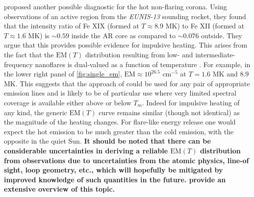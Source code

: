 \documentclass[preprint]{aastex}
\begin{document}
		\par\citet{brosius_pervasive_2014} proposed another possible diagnostic for the hot non-flaring corona. Using observations of an active region from the \textit{EUNIS-13} sounding rocket, they found that the intensity ratio of Fe XIX (formed at $T\approx8.9$ MK) to Fe XII (formed at $T\approx1.6$ MK) is $\sim0.59$ inside the AR core as compared to $\sim0.076$ outside. They argue that this provides possible evidence for impulsive heating. This arises from the fact that the $\mathrm{EM}(T)$ distribution resulting from low- and intermediate-frequency nanoflares is dual-valued as a function of temperature \citep[see \autoref{fig:single_em}-\autoref{fig:ion_em} and][]{cargill_implications_1994}. For example, in the lower right panel of \autoref{fig:single_em}, $\mathrm{EM}\approx 10^{26.5}$ cm$^{-5}$ at $T = 1.6$ MK and $8.9$ MK. This suggests that the approach of \citet{brosius_pervasive_2014} could be used for any pair of appropriate emission lines and is likely to be of particular use where very limited spectral coverage is available either above or below $T_m$. Indeed for impulsive heating of any kind, the generic $\mathrm{EM}(T)$ curve remains similar (though not identical) as the magnitude of the heating changes. For flare-like energy release one would expect the hot emission to be much greater than the cold emission, with the opposite in the quiet Sun. \textbf{It should be noted that there can be considerable uncertainties in deriving a reliable $\mathrm{EM}(T)$ distribution from observations due to uncertainties from the atomic physics, line-of sight, loop geometry, etc., which will hopefully be mitigated by improved knowledge of such quantities in the future. \citet{guennou_can_2013} provide an extensive overview of this topic.}
%
\end{document}
